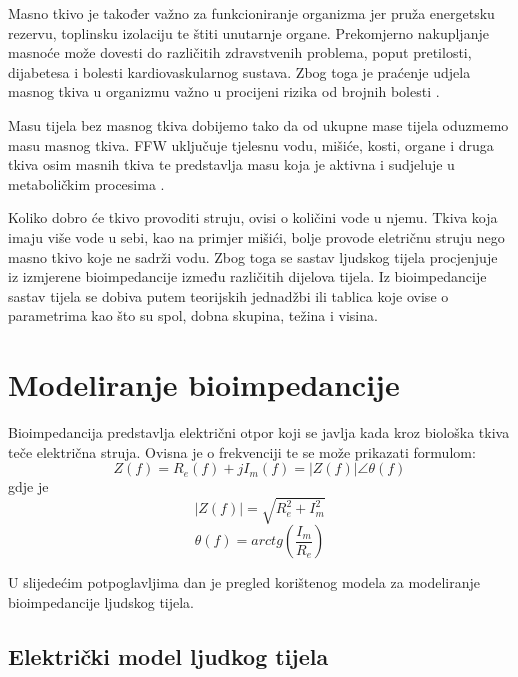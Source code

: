 \documentclass[../diplomski_rad.tex]{subfiles}
\begin{document}
Masno tkivo je također važno za funkcioniranje organizma jer pruža energetsku rezervu, toplinsku izolaciju te štiti unutarnje organe. 
Prekomjerno nakupljanje masnoće može dovesti do različitih zdravstvenih problema, poput pretilosti, dijabetesa i 
bolesti kardiovaskularnog sustava. 
Zbog toga je praćenje udjela masnog tkiva u organizmu važno u procijeni rizika od brojnih bolesti \cite{Bera2014}.

Masu tijela bez masnog tkiva dobijemo tako da od ukupne mase tijela oduzmemo masu masnog tkiva. 
FFW uključuje tjelesnu vodu, mišiće, kosti, organe i druga tkiva osim masnih tkiva te predstavlja masu koja je aktivna i sudjeluje 
u metaboličkim procesima \cite{Bera2014}.

Koliko dobro će tkivo provoditi struju, ovisi o količini vode u njemu. 
Tkiva koja imaju više vode u sebi, kao na primjer mišići, bolje provode eletričnu struju nego masno tkivo koje ne sadrži vodu. 
Zbog toga se sastav ljudskog tijela procjenjuje iz izmjerene bioimpedancije između različitih dijelova tijela. 
Iz bioimpedancije sastav tijela se dobiva putem teorijskih jednadžbi ili tablica koje ovise o parametrima 
kao što su spol, dobna skupina, težina i visina.

\section{Modeliranje bioimpedancije}

Bioimpedancija predstavlja električni otpor koji se javlja kada kroz biološka tkiva teče električna struja.
Ovisna je o frekvenciji te se može prikazati formulom:
\begin{equation}
    \label{jed:cpe}
    Z(f) = R_{e}(f) + jI_{m}(f) = |Z(f)|\angle\theta(f) 
\end{equation}
gdje je
\begin{equation}
    \label{jed:cpe}
    |Z(f)| = \sqrt{R_{e}^{2} + I_{m}^{2}}
\end{equation} 
\begin{equation}
    \label{jed:cpe}
    \theta(f) = arctg(\frac{I_{m}}{R_{e}})
\end{equation} 

U slijedećim potpoglavljima dan je pregled korištenog modela za modeliranje bioimpedancije ljudskog tijela.

\subsection{Električki model ljudkog tijela}
\end{document}
